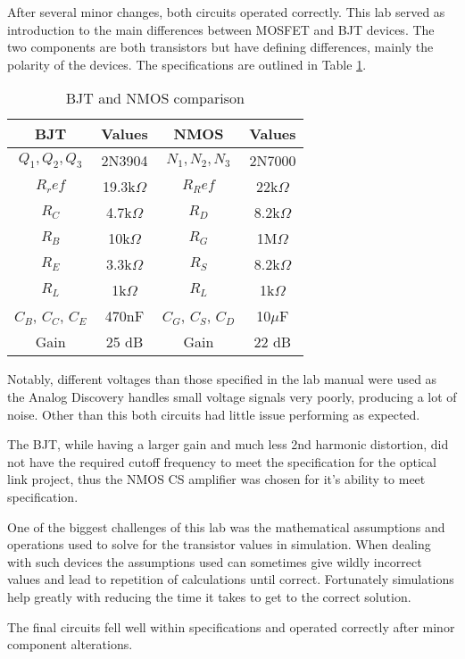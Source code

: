
After several minor changes, both circuits operated correctly. This lab served as introduction to the main differences between MOSFET and BJT devices. The two components are both transistors but have defining differences, mainly the polarity of the devices. The specifications are outlined in Table \ref{tab:specs}.

\begin{table}[H]
	\centering
	\caption{BJT and NMOS comparison}
	\label{tab:specs}
	\begin{tabular}{|c|c|c|c|}
		\hline
		BJT             & Values        & NMOS            & Values       \\ \hline
		$Q_1, Q_2, Q_3$ & 2N3904        & $N_1, N_2, N_3$ & 2N7000       \\ \hline
		$R_ref$         & 19.3k$\Omega$ & $R_Ref$         & 22k$\Omega$  \\ \hline
		$R_C$           & 4.7k$\Omega$  & $R_D$           & 8.2k$\Omega$ \\ \hline
		$R_B$           & 10k$\Omega$   & $R_G$           & 1M$\Omega$   \\ \hline
		$R_E$           & 3.3k$\Omega$  & $R_S$           & 8.2k$\Omega$ \\ \hline
		$R_L$           & 1k$\Omega$    & $R_L$           & 1k$\Omega$   \\ \hline
		$C_B$, $C_C$, $C_E$ & 470nF     & $C_G$, $C_S$, $C_D$ & 10$\mu$F     \\ \hline
		Gain            & 25 dB         & Gain            &  22 dB       \\ \hline
	\end{tabular}
\end{table}


Notably, different voltages than those specified in the lab manual were used as the Analog Discovery handles small voltage signals very poorly, producing a lot of noise.  Other than this both circuits had little issue performing as expected.

The BJT, while having a larger gain and much less 2nd harmonic distortion, did not have the required cutoff frequency to meet the specification for the optical link project, thus the NMOS CS amplifier was chosen for it's ability to meet specification.

One of the biggest challenges of this lab was the mathematical assumptions and operations used to solve for the transistor values in simulation. When dealing with such devices the assumptions used can sometimes give wildly incorrect values and lead to repetition of calculations until correct. Fortunately simulations help greatly with reducing the time it takes to get to the correct solution.

The final circuits fell well within specifications and operated correctly after minor component alterations.



